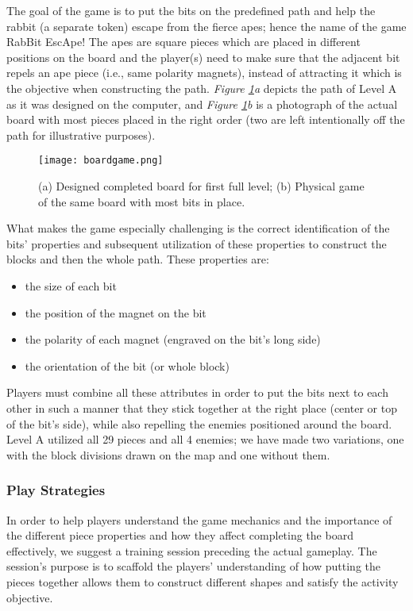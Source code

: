 \documentclass{acm_proc_article-sp}
\begin{document}
The goal of the game is to put the bits on the predefined path and help the rabbit (a separate token) escape from the fierce apes; hence the name of the game RabBit EscApe!
The apes are square pieces which are placed in different positions on the board and the player(s) need to make sure that the adjacent bit repels an ape piece (i.e., same polarity magnets), instead of attracting it which is the objective when constructing the path. 
{\em Figure \ref{fig:board-game}a} depicts the path of Level A as it was designed on the computer, and {\em Figure \ref{fig:board-game}b} is a photograph of the actual board with most pieces placed in the right order (two are left intentionally off the path for illustrative purposes).
\begin{figure}
  \texttt{[image: boardgame.png]}
  \caption{ (a) Designed completed board for first full level; (b) Physical game of the same board with most bits in place. }
  \label{fig:board-game}
\end{figure}

What makes the game especially challenging is the correct identification of the bits' properties and subsequent utilization of these properties to construct the blocks and then the whole path. These properties are:
\begin{itemize}
  \item{the size of each bit}
  \item{the position of the magnet on the bit}
  \item{the polarity of each magnet (engraved on the bit's long side)}
  \item{the orientation of the bit (or whole block)}
\end{itemize}

Players must combine all these attributes in order to put the bits next to each other in such a manner that they stick together at the right place (center or top of the bit's side), while also repelling the enemies positioned around the board.
Level A utilized all 29 pieces and all 4 enemies; we have made two variations, one with the block divisions drawn on the map and one without them.

\subsubsection{Play Strategies}
In order to help players understand the game mechanics and the importance of the different piece properties and how they affect completing the board effectively, we suggest a training session preceding the actual gameplay.
The session's purpose is to scaffold the players' understanding of how putting the pieces together allows them to construct different shapes and satisfy the activity objective.
\end{document}

